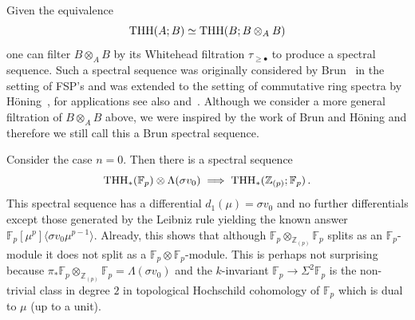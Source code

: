 \begin{remark}
Given the equivalence  
\[ \operatorname{THH}(A;B)\simeq \operatorname{THH}(B;B\otimes_{A}B)\]
one can filter $B\otimes_{A}B$ by its Whitehead filtration $\tau_{\ge \bullet}$ to produce a spectral sequence. Such a spectral sequence was originally considered by Brun~\cite{Bru00} in the setting of FSP's and was extended to the setting of commutative ring spectra by H\"oning~\cite{Hon20}, for applications see also \cite{Cha25} and~\cite{Hys23}. Although we consider a more general filtration of $B\otimes_{A}B$ above, we were inspired by the work of Brun and H\"oning and therefore we still call this a Brun spectral sequence. 
\end{remark}
\begin{example}
Consider the case $n=0$. Then there is a spectral sequence 
\[ 
\operatorname{THH}_{*}(\mathbb{F}_{p})\otimes \Lambda (\sigma v_{0})\implies \operatorname{THH}_{*}(\mathbb{Z}_{(p)};\mathbb{F}_{p}) \,.
\]
This spectral sequence has a differential $d_{1}(\mu)=\sigma v_{0}$ and no further differentials except those generated by the Leibniz rule yielding the known answer $\mathbb{F}_p[\mu^p]\langle \sigma v_0 \mu^{p-1}\rangle$. 
Already, this shows that although $\mathbb{F}_p\otimes_{\mathbb{Z}_{(p)}}\mathbb{F}_p$ splits as an $\mathbb{F}_p$-module it does not split as a $\mathbb{F}_p\otimes \mathbb{F}_p$-module. This is perhaps not surprising because $\pi_*\mathbb{F}_p\otimes_{\mathbb{Z}_{(p)}}\mathbb{F}_p=\Lambda (\sigma v_0)$ and the $k$-invariant $\mathbb{F}_p\to \Sigma^{2}\mathbb{F}_p$ is the non-trivial class in degree $2$ in topological Hochschild cohomology of $\mathbb{F}_p$ which is dual to $\mu$ (up to a unit).
\end{example}

